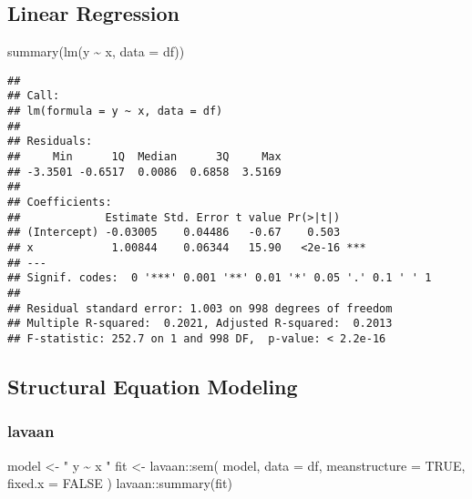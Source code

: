 \documentclass[
]{book}
\newenvironment{Shaded}{\begin{snugshade}}{\end{snugshade}}
\newcommand{\AttributeTok}[1]{\textcolor[rgb]{0.77,0.63,0.00}{#1}}
\newcommand{\ConstantTok}[1]{\textcolor[rgb]{0.00,0.00,0.00}{#1}}
\newcommand{\FunctionTok}[1]{\textcolor[rgb]{0.00,0.00,0.00}{#1}}
\newcommand{\NormalTok}[1]{#1}
\newcommand{\OtherTok}[1]{\textcolor[rgb]{0.56,0.35,0.01}{#1}}
\newcommand{\SpecialCharTok}[1]{\textcolor[rgb]{0.00,0.00,0.00}{#1}}
\newcommand{\StringTok}[1]{\textcolor[rgb]{0.31,0.60,0.02}{#1}}
\theoremstyle{definition}
\theoremstyle{definition}
\theoremstyle{definition}
\theoremstyle{remark}
\begin{document}
\hypertarget{linear-regression}{%
\subsection{Linear Regression}\label{linear-regression}}

\begin{Shaded}
\begin{Highlighting}[]
\FunctionTok{summary}\NormalTok{(}\FunctionTok{lm}\NormalTok{(y }\SpecialCharTok{\textasciitilde{}}\NormalTok{ x, }\AttributeTok{data =}\NormalTok{ df))}
\end{Highlighting}
\end{Shaded}

\begin{verbatim}
## 
## Call:
## lm(formula = y ~ x, data = df)
## 
## Residuals:
##     Min      1Q  Median      3Q     Max 
## -3.3501 -0.6517  0.0086  0.6858  3.5169 
## 
## Coefficients:
##             Estimate Std. Error t value Pr(>|t|)    
## (Intercept) -0.03005    0.04486   -0.67    0.503    
## x            1.00844    0.06344   15.90   <2e-16 ***
## ---
## Signif. codes:  0 '***' 0.001 '**' 0.01 '*' 0.05 '.' 0.1 ' ' 1
## 
## Residual standard error: 1.003 on 998 degrees of freedom
## Multiple R-squared:  0.2021, Adjusted R-squared:  0.2013 
## F-statistic: 252.7 on 1 and 998 DF,  p-value: < 2.2e-16
\end{verbatim}

\hypertarget{structural-equation-modeling}{%
\subsection{Structural Equation Modeling}\label{structural-equation-modeling}}

\hypertarget{lavaan-lavaan2012}{%
\subsubsection{\texorpdfstring{lavaan \citep{lavaan2012}}{lavaan {[}@lavaan2012{]}}}\label{lavaan-lavaan2012}}

\begin{Shaded}
\begin{Highlighting}[]
\NormalTok{model }\OtherTok{\textless{}{-}} \StringTok{"}
\StringTok{  y \textasciitilde{} x}
\StringTok{"}
\NormalTok{fit }\OtherTok{\textless{}{-}}\NormalTok{ lavaan}\SpecialCharTok{::}\FunctionTok{sem}\NormalTok{(}
\NormalTok{  model,}
  \AttributeTok{data =}\NormalTok{ df,}
  \AttributeTok{meanstructure =} \ConstantTok{TRUE}\NormalTok{,}
  \AttributeTok{fixed.x =} \ConstantTok{FALSE}
\NormalTok{)}
\NormalTok{lavaan}\SpecialCharTok{::}\FunctionTok{summary}\NormalTok{(fit)}
\end{Highlighting}
\end{Shaded}
\end{document}

